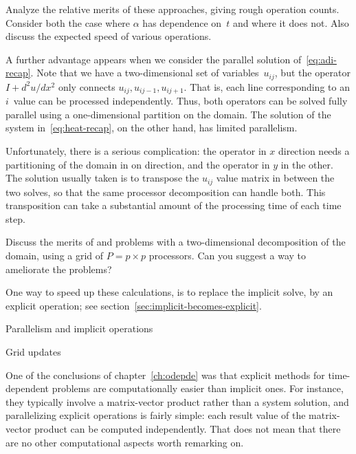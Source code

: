 \begin{exercise}
  Analyze the relative merits of these approaches, giving rough
  operation counts. Consider both the case where $\alpha$ has
  dependence on~$t$ and where it does not. Also discuss the expected
  speed of various operations.
\end{exercise}

A further advantage appears when we consider the parallel solution
of~\eqref{eq:adi-recap}. Note that we have a two-dimensional set of
variables~$u_{ij}$, but the operator $I+d^2u/dx^2$ only connects
$u_{ij},u_{ij-1},u_{ij+1}$. That is, each line corresponding to an
$i$~value can be processed independently. Thus, both operators can be
solved fully parallel using a one-dimensional partition on the domain.
The solution of the system in~\eqref{eq:heat-recap}, on the other
hand, has limited parallelism.

Unfortunately, there is a serious complication: the operator in $x$
direction needs a partitioning of the domain in on direction, and the
operator in $y$ in the other. The solution usually taken is to
transpose the $u_{ij}$ value matrix in between the two solves, so that
the same processor decomposition can handle both. This transposition
can take a substantial amount of the processing time of each time step.

\begin{exercise}
  Discuss the merits of and problems with a two-dimensional
  decomposition of the domain, using a grid of $P=p\times p$
  processors. Can you suggest a way to ameliorate the problems?
\end{exercise}

One way to speed up these calculations, is to replace the implicit
solve, by an explicit operation; see
section~\ref{sec:implicit-becomes-explicit}.

 {Parallelism and implicit operations}
\label{sec:parallel-implicit}


 {Grid updates}

One of the conclusions of chapter~\ref{ch:odepde} was that explicit
methods for time-dependent problems are computationally easier than
implicit ones.  For instance, they typically involve a matrix-vector
product rather than a system solution, and parallelizing explicit
operations is fairly simple: each result value of the matrix-vector
product can be computed independently. That does not mean that there
are no other computational aspects worth remarking on.

